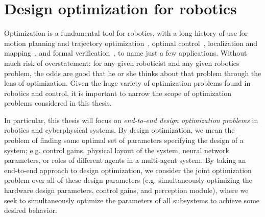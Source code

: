 
\section{Design optimization for robotics}

Optimization is a fundamental tool for robotics, with a long history of use for motion planning and trajectory optimization~\cite{schulmanMotionPlanningSequential2014}, optimal control~\cite{liberzonCalculusVariationsOptimal2012}, localization and mapping~\cite{dellaertFactorGraphsExploiting2021}, and formal verification~\cite{liuAlgorithmsVerifyingDeep2021}, to name just a few applications. Without much risk of overstatement: for any given roboticist and any given robotics problem, the odds are good that he or she thinks about that problem through the lens of optimization. Given the huge variety of optimization problems found in robotics and control, it is important to narrow the scope of optimization problems considered in this thesis.

In particular, this thesis will focus on \textit{end-to-end design optimization problems} in robotics and cyberphysical systems. By design optimization, we mean the problem of finding some optimal set of parameters specifying the design of a system; e.g. control gains, physical layout of the system, neural network parameters, or roles of different agents in a multi-agent system. By taking an end-to-end approach to design optimization, we consider the joint optimization problem over all of these design parameters (e.g. simultaneously optimizing the hardware design parameters, control gains, and perception module), where we seek to simultaneously optimize the parameters of all subsystems to achieve some desired behavior.

